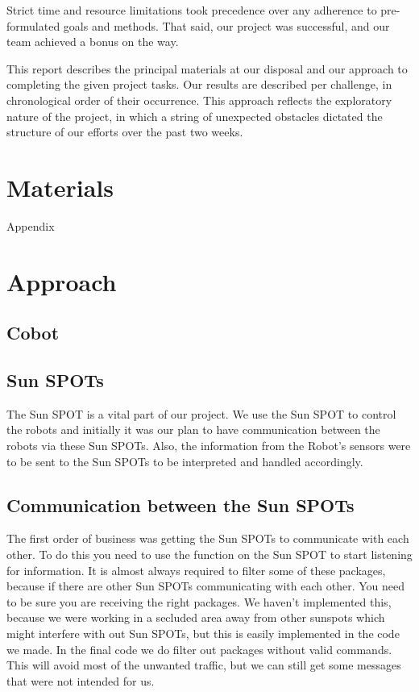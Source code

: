 \documentclass[a4paper,10pt]{article} %
\begin{document}
Strict time and resource limitations took precedence over any adherence
to pre-formulated goals and methods. That said, our project was successful,
and our team achieved a bonus on the way.

This report describes the principal materials at our disposal and our approach
to completing the given project tasks. Our results are described per challenge,
in chronological order of their occurrence. This approach reflects the
exploratory nature of the project, in which a string of unexpected obstacles
dictated the structure of our efforts over the past two weeks.


\section{Materials} %

Appendix



\section{Approach} %

\subsection{Cobot} %


\subsection{Sun SPOTs} %
\label{sec:sunspot}

The Sun SPOT is a vital part of our project. We use the Sun SPOT to control the
robots and initially it was our plan to have communication between the robots
via these Sun SPOTs. Also, the information from the Robot's sensors were to be
sent to the Sun SPOTs to be interpreted and handled accordingly.


\subsection{Communication between the Sun SPOTs} %
\label{subsec:comm}

The first order of business was getting the Sun SPOTs to communicate with each
other. To do this you need to use the function on the Sun SPOT to start
listening for information. It is almost always required to filter some of these
packages, because if there are other Sun SPOTs communicating with each other.
You need to be sure you are receiving the right packages. We haven't implemented
this, because we were working in a secluded area away from other sunspots which
might interfere with out Sun SPOTs, but this is easily implemented in the code
we made. In the final code we do filter out packages without valid commands.
This will avoid most of the unwanted traffic, but we can still get some messages
that were not intended for us. \\
\end{document}
